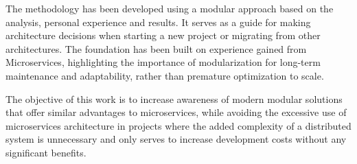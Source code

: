 The methodology has been developed using a modular approach based on the analysis, personal experience and results. It serves as a guide for making architecture decisions when starting a new project or migrating from other architectures. The foundation has been built on experience gained from Microservices, highlighting the importance of modularization for long-term maintenance and adaptability, rather than premature optimization to scale. 


The objective of this work is to increase awareness of modern modular solutions that offer similar advantages to microservices, while avoiding the excessive use of microservices architecture in projects where the added complexity of a distributed system is unnecessary and only serves to increase development costs without any significant benefits.

